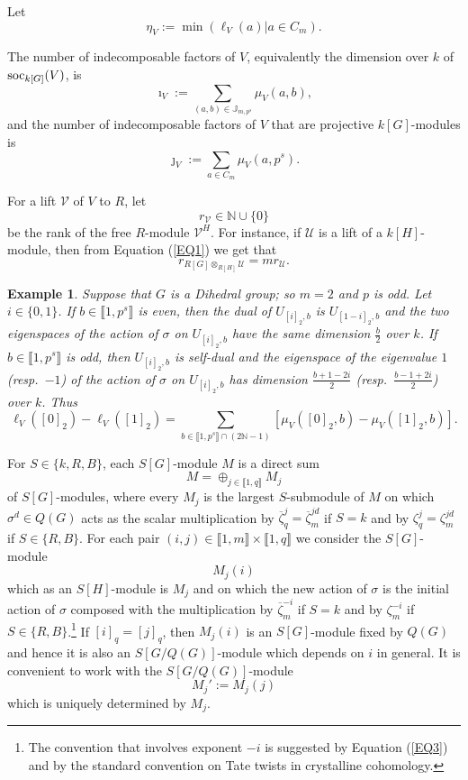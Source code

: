 \documentclass[11pt]{amsart}
\newtheorem{ex}[theorem]{Example}
\def\soc{\textup{soc}}
\begin{document}
Let
$$\eta_V:=\min(\ell_V(a)|a\in C_m).$$

The number of indecomposable factors of $V$, equivalently the dimension over $k$ of $\soc_{k[G]}(V)$, is 
$$\imath_V:=\sum_{(a,b)\in\mathbb J_{m,p^s}} \mu_V(a,b),$$
and the number of indecomposable factors of $V$ that are projective $k[G]$-modules is 
$$\jmath_V:=\sum_{a\in C_m} \mu_V(a,p^s).$$

For a lift $\mathcal V$ of $V$ to $R$, let 
$$r_{\mathcal V}\in\mathbb N\cup\{0\}$$ 
be the rank of the free $R$-module ${\mathcal V}^H$. For instance, if $\mathcal U$ is a lift of a $k[H]$-module, then from Equation (\ref{EQ1}) we get that 
\begin{equation}\label{EQ6}
r_{R[G]\otimes_{R[H]}\mathcal U}=mr_{\mathcal U}. 
\end{equation}

\begin{ex}\normalfont\label{EX1}
Suppose that $G$ is a Dihedral group; so $m=2$ and $p$ is odd. Let $i\in\{0,1\}$. If $b\in\llbracket1,p^s\rrbracket$ is even, then the dual of $U_{[i]_2,b}$ is $U_{[1-i]_2,b}$ and the two eigenspaces of the action of $\sigma$ on $U_{[i]_2,b}$ have the same dimension $\frac{b}{2}$ over $k$. If $b\in\llbracket1,p^s\rrbracket$ is odd, then $U_{[i]_2,b}$ is self-dual and the eigenspace of the eigenvalue $1$ (resp.\ $-1$) of the action of $\sigma$ on $U_{[i]_2,b}$ has dimension $\frac{b+1-2i}{2}$ (resp.\ $\frac{b-1+2i}{2}$) over $k$. Thus
$$\ell_V([0]_2)-\ell_V([1]_2)=\sum_{b\in \llbracket1,p^s\rrbracket\cap (2\mathbb N-1)} [\mu_V([0]_2,b)-\mu_V([1]_2,b)].$$
\end{ex}

For $S\in\{k,R,B\}$, each $S[G]$-module $M$ is a direct sum 
\begin{equation}\label{EQ8}
M=\oplus_{j\in\llbracket1,q\rrbracket} M_j
\end{equation} 
of $S[G]$-modules, where every $M_j$ is the largest $S$-submodule of $M$ on which $\sigma^d\in Q(G)$ acts as the scalar multiplication by $\overline{\zeta}_q^j=\overline{\zeta}_m^{jd}$ if $S=k$ and by $\zeta_q^j=\zeta_m^{jd}$ if $S\in\{R,B\}$. For each pair $(i,j)\in\llbracket1,m\rrbracket\times\llbracket1,q\rrbracket$ we consider the $S[G]$-module 
\begin{equation}\label{EQ9}
M_j(i)
\end{equation}
which as an $S[H]$-module is $M_j$ and on which the new action of $\sigma$ is the initial action of $\sigma$ composed with the multiplication by $\overline{\zeta}_m^{-i}$ if $S=k$ and by $\zeta_m^{-i}$ if $S\in\{R,B\}$.\footnote{The convention that involves exponent $-i$ is suggested by Equation (\ref{EQ3}) and by the standard convention on Tate twists in crystalline cohomology.} If $[i]_q=[j]_q$, then $M_j(i)$ is an $S[G]$-module fixed by $Q(G)$ and hence it is also an $S[G/Q(G)]$-module which depends on $i$ in general. It is convenient to work with the $S[G/Q(G)]$-module 
\begin{equation}\label{EQ10}
M_j':=M_j(j)
\end{equation}
which is uniquely determined by $M_j$.
\end{document}
